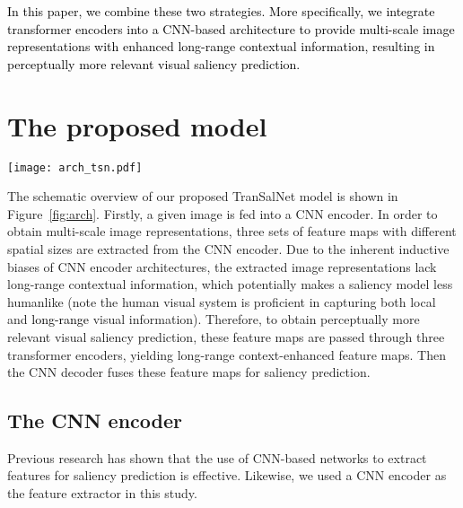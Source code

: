 \documentclass{article}
\begin{document}
\textcolor{black}{
In this paper, we combine these two strategies. 
More specifically, we integrate transformer encoders into a CNN-based architecture to provide multi-scale image representations with enhanced long-range contextual information, 
resulting in perceptually more relevant visual saliency prediction.}



\section{The proposed model}

\begin{figure*}
\centering
\texttt{[image: arch\_tsn.pdf]}
\caption{Schematic overview of TranSalNet. Assume that the spatial size of inputs is . After the input image is processed by the CNN encoder, which provides three sets of multi-scale feature maps have spatial size of , , and , respectively. Then the contextual information of these feature maps is enhanced by transformer encoders. The predicted saliency map is generated by the CNN decoder, which uses skip-connection (\textcolor{black}{orange arrows}) and element-wise production to fuse multi-scale context-enhance feature maps. The illustration of the transformer encoder is shown below the architecture diagram, which consists of standard Multi-head Self-Attention (MSA) and Multi-layer Perceptron (MLP) blocks.}
\label{fig:arch}
\end{figure*}

The schematic overview of our proposed TranSalNet model is shown in Figure~\ref{fig:arch}. 
Firstly, a given image is fed into a CNN encoder. In order to obtain multi-scale image representations, three sets of feature maps with different spatial sizes are extracted from the CNN encoder. Due to the inherent inductive biases of CNN encoder architectures, the extracted image representations lack long-range contextual information, which potentially makes a saliency model less humanlike (note the human visual system is proficient in capturing both local and \textcolor{black}{long-range} visual information). Therefore, to obtain perceptually more relevant visual saliency prediction, these feature maps are passed through three transformer encoders, yielding long-range context-enhanced feature maps. Then the CNN decoder fuses these feature maps for saliency prediction.  

\subsection{The CNN encoder}
Previous research has shown that the use of CNN-based networks to extract features for saliency prediction is effective. Likewise, we used a CNN encoder as the feature extractor in this study.
\end{document}
